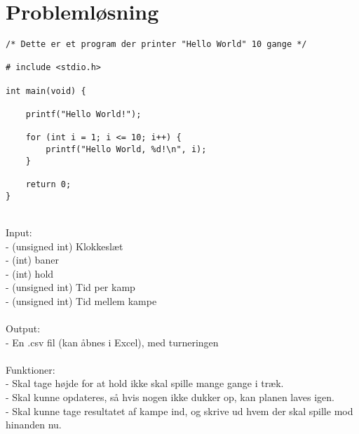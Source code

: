 \chapter{Problemløsning}\label{ch:chlabel}


\begin{verbatim}
/* Dette er et program der printer "Hello World" 10 gange */

# include <stdio.h>

int main(void) {
    
    printf("Hello World!");
    
    for (int i = 1; i <= 10; i++) {
        printf("Hello World, %d!\n", i);
    }
    
    return 0;
}
\end{verbatim}
\\
Input:\\
 - (unsigned int) Klokkeslæt\\
 - (int) baner\\
 - (int) hold\\
 - (unsigned int) Tid per kamp\\
 - (unsigned int) Tid mellem kampe\\ 
 \\
 Output: \\
  - En .csv fil (kan åbnes i Excel), med turneringen\\
\\
Funktioner: \\
 - Skal tage højde for at hold ikke skal spille mange gange i træk.\\
 - Skal kunne opdateres, så hvis nogen ikke dukker op, kan planen laves igen.\\
 - Skal kunne tage resultatet af kampe ind, og skrive ud hvem der skal spille mod hinanden nu.\\
 